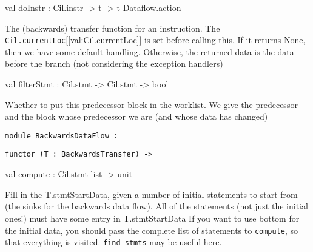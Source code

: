 \documentclass[11pt]{article}
\begin{document}
\begin{ocamldocsigend}
\begin{ocamldocdescription}
\end{ocamldocdescription}


\label{val:Dataflow.BackwardsTransfer.doInstr}\begin{ocamldoccode}
val doInstr : Cil.instr ->
  t -> t Dataflow.action
\end{ocamldoccode}
\begin{ocamldocdescription}
The (backwards) transfer function for an instruction. The 
 {\tt{Cil.currentLoc}}[\ref{val:Cil.currentLoc}] is set before calling this. If it returns None, then we 
 have some default handling. Otherwise, the returned data is the data 
 before the branch (not considering the exception handlers)


\end{ocamldocdescription}


\label{val:Dataflow.BackwardsTransfer.filterStmt}\begin{ocamldoccode}
val filterStmt : Cil.stmt -> Cil.stmt -> bool
\end{ocamldoccode}
\begin{ocamldocdescription}
Whether to put this predecessor block in the worklist. We give the 
 predecessor and the block whose predecessor we are (and whose data has 
 changed)


\end{ocamldocdescription}
\end{ocamldocsigend}






\begin{ocamldoccode}
{\tt{module }}{\tt{BackwardsDataFlow}}{\tt{ : }}\end{ocamldoccode}
\label{module:Dataflow.BackwardsDataFlow}

{\tt{functor (}}{\tt{T}}{\tt{ : }}{\tt{BackwardsTransfer}}{\tt{) -> }}\begin{ocamldocsigend}


\label{val:Dataflow.BackwardsDataFlow.compute}\begin{ocamldoccode}
val compute : Cil.stmt list -> unit
\end{ocamldoccode}
\begin{ocamldocdescription}
Fill in the T.stmtStartData, given a number of initial statements to 
 start from (the sinks for the backwards data flow). All of the statements
 (not just the initial ones!) must have some entry in T.stmtStartData 
 If you want to use bottom for the initial data, you should pass the
 complete list of statements to {\tt{compute}}, so that everything is visited.
 {\tt{find\_stmts}} may be useful here.


\end{ocamldocdescription}
\end{ocamldocsigend}
\end{document}
